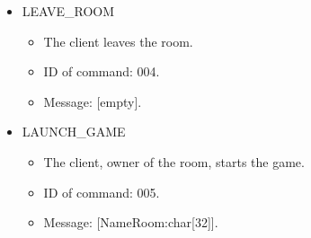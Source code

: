 \documentclass[a4 paper, 12pt]{report}
\begin{document}
\begin{itemize}
\item LEAVE\_ROOM
  \begin{itemize}
  \item The client leaves the room.
  \item ID of command: 004.
  \item Message: [empty].
  \end{itemize}

\item LAUNCH\_GAME
  \begin{itemize}
  \item The client, owner of the room, starts the game.
  \item ID of command: 005.
  \item Message: [NameRoom:char[32]].
  \end{itemize}
\end{itemize}
\end{document}
